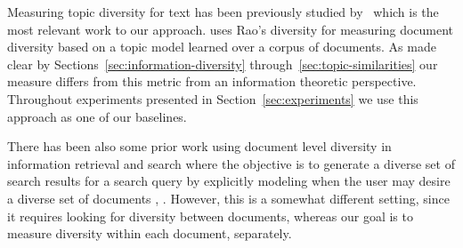 Measuring topic diversity for text has been previously studied by~\cite{bache:2013} which is the most relevant work to our approach. \cite{bache:2013} uses Rao's diversity \cite{rao:1982} for measuring document diversity based on a topic model learned over a corpus of documents. As made clear by Sections~\ref{sec:information-diversity} through~\ref{sec:topic-similarities} our measure differs from this metric from an information theoretic perspective. Throughout experiments presented in Section~\ref{sec:experiments} we use this approach as one of our baselines. 

There has been also some prior work using document level diversity in information retrieval and search where the objective is to generate a diverse set of search results for a search query by explicitly modeling when the user may desire a diverse set of documents \cite{Welch:2011:SRD:1963405.1963441}, \cite{Gillenwater12discoveringdiverse}. However, this is a somewhat different setting, since it requires looking for diversity between documents, whereas our goal is to measure diversity within each document, separately.

